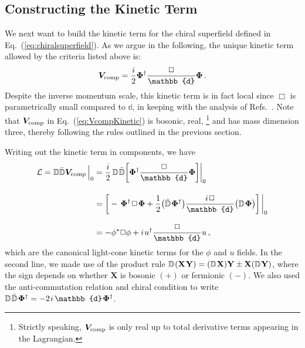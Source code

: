 \documentclass[12pt,document,nofootinbib,superscriptaddress,onecolumn,preprintnumbers,balancelastpage]{article}
\newcommand{\s}{\hspace{0.8pt}}
\newcommand{\PP}{\mathbb{d}}
\DeclareRobustCommand{\Eq}[1]{Eq.~(\ref{#1})}
\DeclareRobustCommand{\Refs}[1]{Refs.~\cite{#1}}
\newcommand{\D}{\mathbb{D}}
\newcommand{\Dbar}{\bar{\mathbb{D}}}
\newcommand{\bPhi}{\boldsymbol{\Phi}}
\newcommand{\bV}{\boldsymbol{V}}
\begin{document}
\begin{spacing}{1.2}
\subsection{Constructing the Kinetic Term}
\label{subsec:chiral_kinetic}

We next want to build the kinetic term for the chiral superfield defined in \Eq{eq:chiralsuperfield}.
%
As we argue in the following, the unique kinetic term allowed by the criteria listed above is: 
%
\begin{equation}
\label{eq:VcompKinetic}
\bV_{\rm comp} =  \frac{i}{2}\bPhi^\dagger \frac{\Box}{\PP}  \bPhi\,.
\end{equation}
%
Despite the inverse momentum scale, this kinetic term is in fact local since $\Box$ is parametrically small compared to $\PP$, in keeping with the analysis of \Refs{Cohen:2016jzp, Cohen:2016dcl}.
%
Note that $\bV_{\rm comp}$ in \Eq{eq:VcompKinetic} is bosonic, real,%
%
\footnote{Strictly speaking, $\bV_{\rm comp}$ is only real up to total derivative terms appearing in the Lagrangian.}
%
and has mass dimension three, thereby following the rules outlined in the previous section.


Writing out the kinetic term in components, we have  
\begin{align}
\label{eq:SUSYSCETLagrangian}
\mathcal{L}  =\D \bar{\D} \bV_{\rm comp} \,\Big|_{0} 
& =\frac{i}{2}\,  \D \s\bar{\D} \bigg[ \bPhi^\dagger \frac{\Box}{\PP}  \bPhi \bigg] \bigg|_{0}   \notag\\[10pt]
& =  \bigg[- \,\bPhi^\dagger\s  \Box\s \bPhi +\frac{1}{2} \big( \bar{\D}\s  \bPhi^\dagger \big)\frac{i\s \Box}{\PP} \big(\D\s \bPhi \big)\bigg]\, \bigg|_{0}  \notag\\[10pt]
& = -\phi^* \Box \phi + i\s u^\dag \frac{\Box}{\PP} u\,,
\end{align}
%
which are the canonical  light-cone kinetic terms for the $\phi$ and $u$ fields.
%
In the second line, we made use of the product rule $\D\s(\mathbf{X\s Y}) = (\D\s \mathbf{X})\mathbf{Y} \pm \mathbf{X}(\D\s \mathbf{Y})$, where the sign depends on whether $\mathbf{X}$ is bosonic $(+)$ or fermionic $(-)$.
%
We also used the anti-commutation relation and chiral condition to write $\D \s\Dbar\s \bPhi^\dagger = -2\s i\, \PP\s \bPhi^\dagger$.


\end{spacing}
\end{document}
